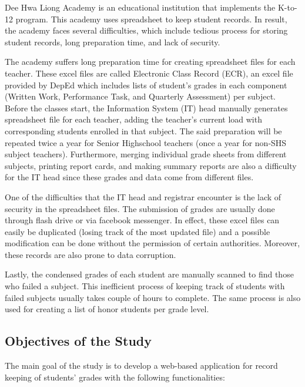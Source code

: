 \documentclass[11pt,a4paper,titlepage]{article}
\begin{document}
Dee Hwa Liong Academy is an educational institution that implements the K-to-12 program. This academy uses spreadsheet to keep student records. In result, the academy faces several difficulties, which include tedious process for storing student records, long preparation time, and lack of security.

The academy suffers long preparation time for creating spreadsheet files for each teacher. These excel files are called Electronic Class Record (ECR), an excel file provided by DepEd which includes lists of student's grades in each component (Written Work, Performance Task, and Quarterly Assessment) per subject. Before the classes start, the Information System (IT) head manually generates spreadsheet file for each teacher, adding the teacher's current load with corresponding students enrolled in that subject. The said preparation will be repeated twice a year for Senior Highschool teachers (once a year for non-SHS subject teachers). Furthermore, merging individual grade sheets from different subjects, printing report cards, and making summary reports are also a difficulty for the IT head since these grades and data come from different files.

One of the difficulties that the IT head and registrar encounter is the lack of security in the spreadsheet files. The submission of grades are usually done through flash drive or via facebook messenger. In effect, these excel files can easily be duplicated (losing track of the most updated file) and a possible modification can be done without the permission of certain authorities. Moreover, these records are also prone to data corruption.

Lastly, the condensed grades of each student are manually scanned to find those who failed a subject. This inefficient process of keeping track of students with failed subjects usually takes couple of hours to complete. The same process is also used for creating a list of honor students per grade level. 






\subsection{Objectives of the Study}
The main goal of the study is to develop a web-based application for record keeping of students' grades with the following functionalities:
\end{document}

